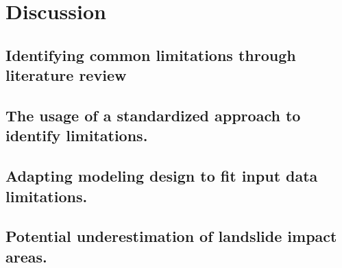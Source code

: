 
\chapter{Discussion}\label{Discussion} 	

{\textcolor{red}{ \lipsum[1]}}

\section{Identifying common limitations through literature review} 
{\textcolor{red}{ \lipsum[1]}}



\section{The usage of a standardized approach to identify limitations.}
{\textcolor{red}{ \lipsum[1]}}



\section{Adapting modeling design to fit input data limitations.}
{\textcolor{red}{ \lipsum[1]}}



\section{Potential underestimation of landslide impact areas.} 
{\textcolor{red}{ \lipsum[1]}}